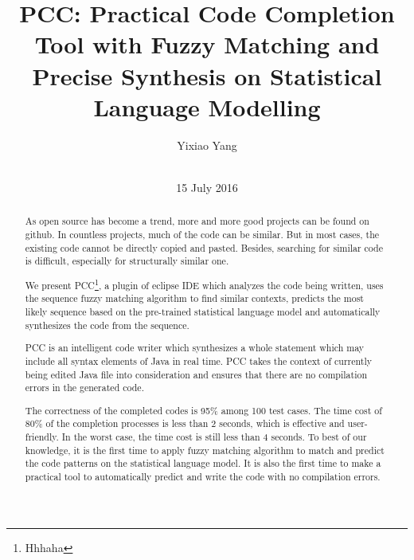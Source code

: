 \documentclass{sig-alternate-05-2015}
\begin{document}


\title{PCC: Practical Code Completion Tool with Fuzzy Matching and Precise Synthesis on Statistical Language Modelling}\vspace{-2cm}

\author{
\alignauthor
Yixiao Yang \\
        \\
}
\date{15 July 2016}
\maketitle
\begin{abstract}
As open source has become a trend, more and more good projects can be found on github. In countless projects, much of the code can be similar. But in most cases, the existing code cannot be directly copied and pasted. Besides, searching for similar code is difficult, especially for structurally similar one.


We present PCC\footnote{Hhhaha}, a plugin of eclipse IDE which analyzes the code being written, uses the sequence fuzzy matching algorithm to find similar contexts, predicts the most likely sequence based on the pre-trained statistical language model and automatically synthesizes the code from the sequence.

PCC is an intelligent code writer which synthesizes a whole statement which may include all syntax elements of Java in real time. PCC takes the context of currently being edited Java file into consideration and ensures that there are no compilation errors in the generated code.

The correctness of the completed codes is 95\% among 100 test cases. The time cost of 80\% of the completion processes is less than 2 seconds, which is effective and user-friendly. In the worst case, the time cost is still less than 4 seconds. To best of our knowledge, it is the first time to apply fuzzy matching algorithm to match and predict the code patterns on the statistical language model. It is also the first time to make a practical tool to automatically predict and write the code with no compilation errors.
\end{abstract}
\end{document}
